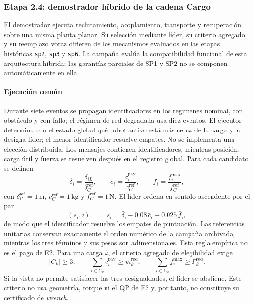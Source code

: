 

\subsubsection{Etapa 2.4: demostrador híbrido de la cadena Cargo}
\label{subsubsec:sp2-cargo-e2e}

El demostrador ejecuta reclutamiento, acoplamiento, transporte y recuperación sobre una misma planta planar. Su selección mediante líder, su criterio agregado y su reemplazo voraz difieren de los mecanismos evaluados en las etapas históricas \texttt{sp2}, \texttt{sp3} y \texttt{sp6}. La campaña evalúa la compatibilidad funcional de esta arquitectura híbrida; las garantías parciales de SP1 y SP2 no se componen automáticamente en ella.

\paragraph{Ejecución común}

Durante siete eventos se propagan identificadores en los regímenes nominal, con obstáculo y con fallo; el régimen de red degradada usa diez eventos. El ejecutor determina con el estado global qué robot activo está más cerca de la carga y lo designa líder; el menor identificador resuelve empates. No se implementa una elección distribuida. Los mensajes contienen identificadores, mientras posición, carga útil y fuerza se resuelven después en el registro global. Para cada candidato se definen
\begin{equation}
 \bar\delta_i=\frac{\delta_{iL}}{\delta_C^{\mathrm{ref}}},\qquad
 \bar c_i=\frac{c_i^{\mathrm{pay}}}{c_C^{\mathrm{ref}}},\qquad
 \bar f_i=\frac{f_i^{\max}}{f_C^{\mathrm{ref}}},
 \label{eq:cargo-ranking-normalization}
\end{equation}
con $\delta_C^{\mathrm{ref}}=1\,\mathrm{m}$, $c_C^{\mathrm{ref}}=1\,\mathrm{kg}$ y $f_C^{\mathrm{ref}}=1\,\mathrm{N}$. El líder ordena en sentido ascendente por el par
\begin{equation}
 \left(s_i,i\right),\qquad
 s_i=\bar\delta_i-0.08\,\bar c_i-0.025\,\bar f_i,
 \label{eq:cargo-ranking}
\end{equation}
de modo que el identificador resuelve los empates de puntuación. Las referencias unitarias conservan exactamente el orden numérico de la campaña archivada, mientras los tres términos y sus pesos son adimensionales. Esta regla empírica no es el pago de E2. Para una carga $k$, el criterio agregado de elegibilidad exige
\begin{equation}
 |C_k|\geq3,\qquad
 \sum_{i\in C_k}c_i^{\mathrm{pay}}\geq m_k^{\mathrm{req}},\qquad
 \sum_{i\in C_k}f_i^{\max}\geq F_k^{\mathrm{req}}.
 \label{eq:cargo-aggregate-certificate}
\end{equation}
Si la vista no permite satisfacer las tres desigualdades, el líder se abstiene. Este criterio no usa geometría, torque ni el QP de E3 y, por tanto, no constituye su certificado de \emph{wrench}.


